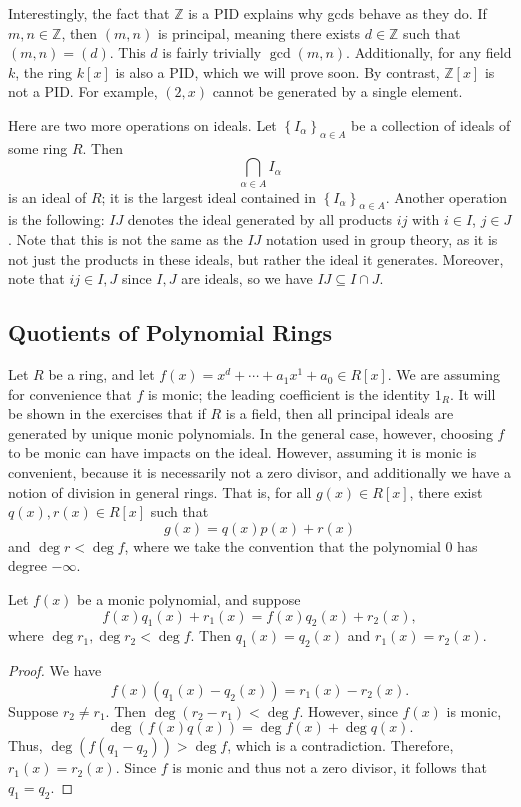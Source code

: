 Interestingly, the fact that $\mathbb{Z}$ is a PID explains why gcds behave as they do. If $m,n\in\mathbb{Z}$, then $(m,n)$ is principal, meaning there exists $d\in \mathbb{Z}$ such that $(m,n)=(d)$. This $d$ is fairly trivially $\operatorname{gcd}(m,n) $. Additionally, for any field $k$, the ring $k[x]$ is also a PID, which we will prove soon. By contrast, $\mathbb{Z}[x]$ is not a PID. For example, $(2,x)$ cannot be generated by a single element.

Here are two more operations on ideals. Let $\left\{ I_{\alpha } \right\}_{\alpha \in A}$ be a collection of ideals of some ring $R$. Then
\[
	\bigcap_{\alpha \in A} I_{\alpha }
\]
is an ideal of $R$; it is the largest ideal contained in $\left\{ I_{\alpha } \right\}_{\alpha \in A}$. Another operation is the following: $IJ$ denotes the ideal generated by all products $ij$ with $i\in I$, $j\in J$. Note that this is not the same as the $IJ$ notation used in group theory, as it is not just the products in these ideals, but rather the ideal it generates. Moreover, note that $ij\in I,J$ since $I,J$ are ideals, so we have $IJ\subseteq I\cap J$.
\subsection{Quotients of Polynomial Rings}
Let $R$ be a ring, and let $f(x) = x^d + \cdots + a_1x^1 + a_0\in R[x]$. We are assuming for convenience that $f$ is monic; the leading coefficient is the identity $1_R$. It will be shown in the exercises that  if $R$ is a field, then all principal ideals are generated by unique monic polynomials. In the general case, however, choosing $f$ to be monic can have impacts on the ideal. However, assuming it is monic is convenient, because it is necessarily not a zero divisor, and additionally we have a notion of division in general rings. That is, for all $g(x)\in R[x]$, there exist $q(x),r(x)\in R[x]$ such that
\[
	g(x)=q(x)p(x)+r(x)
\]
and $\operatorname{deg}r < \operatorname{deg}f  $, where we take the convention that the polynomial $0$ has degree $-\infty$.
\begin{lemma}\label{lma:3.4.1}
	Let $f(x)$ be a monic polynomial, and suppose
	\[
		f(x)q_1(x)+r_1(x)=f(x)q_2(x)+r_2(x)
	,\]
	where $\operatorname{deg}r_1,\operatorname{deg}r_2 < \operatorname{deg}f   $. Then $q_1(x)=q_2(x)$ and $r_1(x)=r_2(x)$.
\end{lemma}
\begin{proof}
	We have
	\[
		f(x)(q_1(x)-q_2(x))=r_1(x)-r_2(x)
	.\]
	Suppose $r_2 \neq r_1$. Then $\operatorname{deg}(r_2-r_1) <\operatorname{deg}f $. However, since $f(x)$ is monic,
	\[
		\operatorname{deg}(f(x)q(x)) =\operatorname{deg} f(x)+\operatorname{deg} q(x)
	.\]
	Thus, $\operatorname{deg}(f(q_1-q_2)) > \operatorname{deg} f$, which is a contradiction. Therefore, $r_1(x)=r_2(x)$. Since $f$ is monic and thus not a zero divisor, it follows that $q_1=q_2$.
\end{proof}

